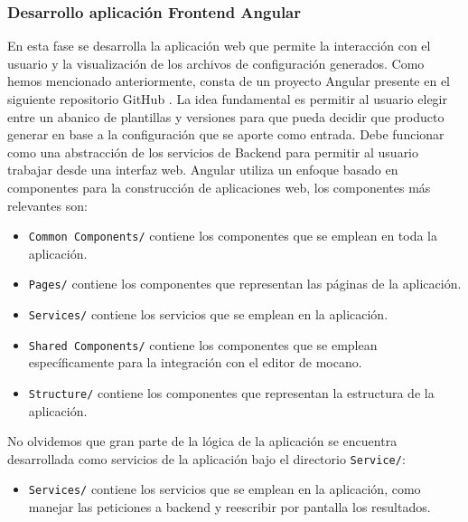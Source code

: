 \documentclass[12pt, a4paper, twoside]{article}
\begin{document}
\subsubsection{Desarrollo aplicación Frontend Angular}
En esta fase se desarrolla la aplicación web que permite la interacción con el usuario y la visualización de los archivos de configuración generados. Como hemos mencionado anteriormente, consta de un proyecto Angular presente en el siguiente repositorio GitHub \cite{m4rdom_frontend}.
La idea fundamental es permitir al usuario elegir entre un abanico de plantillas y versiones para que pueda decidir que producto generar en base a la configuración que se aporte como entrada.
Debe funcionar como una abstracción de los servicios de Backend para permitir al usuario trabajar desde una interfaz web.
Angular utiliza un enfoque basado en componentes para la construcción de aplicaciones web, los componentes más relevantes son:
\begin{itemize}
	\item \texttt{Common Components/} contiene los componentes que se emplean en toda la aplicación.
	\item \texttt{Pages/} contiene los componentes que representan las páginas de la aplicación.
	\item \texttt{Services/} contiene los servicios que se emplean en la aplicación.
	\item \texttt{Shared Components/} contiene los componentes que se emplean específicamente para la integración con el editor de mocano.
	\item \texttt{Structure/} contiene los componentes que representan la estructura de la aplicación.
\end{itemize}

No olvidemos que gran parte de la lógica de la aplicación se encuentra desarrollada como servicios de la aplicación bajo el directorio \texttt{Service/}: 

\begin{itemize}
	\item \texttt{Services/} contiene los servicios que se emplean en la aplicación, como manejar las peticiones a backend y reescribir por pantalla los resultados.
\end{itemize}
\end{document}
